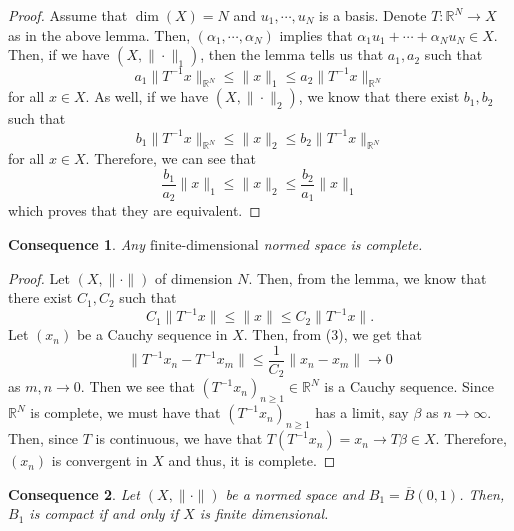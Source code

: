 \documentclass[12pt]{article}
\newtheorem{cons}{Consequence}
\newcommand{\R}{{\mathbb R}}
\newcommand{\fd}{{\text{finite-dimensional}}}
\begin{document}
\vspace{-25pt}
\begin{proof}
Assume that $\dim(X) = N$ and $u_1, \cdots, u_N$ is a basis. Denote $T: \R^N \to X$ as in the above lemma. Then, $(\alpha_1, \cdots, \alpha_N)$ implies that $\alpha_1 u_1 + \cdots + \alpha_N u_N \in X$. Then, if we have $(X, \| \cdot \|_1)$, then the lemma tells us that $a_1, a_2$ such that 
\[a_1 \| T^{-1} x \|_{\R^N} \leq \| x \|_1 \leq a_2 \| T^{-1} x \|_{\R^N}\]
for all $x \in X$. As well, if we have $(X, \| \cdot \|_2)$, we know that there exist $b_1, b_2 $ such that 
\[ b_1 \| T^{-1} x \|_{\R^N} \leq \| x \|_2 \leq b_2 \| T^{-1} x \|_{\R^N}\]
for all $x \in X$. Therefore, we can see that 
\[ \frac{b_1}{a_2} \| x \|_1 \leq \| x \|_2 \leq \frac{b_2}{a_1} \| x \|_1\]
which proves that they are equivalent.
\end{proof}
\begin{cons}
Any $\fd$ normed space is complete. 
\end{cons}
\vspace{-25pt}
\begin{proof}
Let $(X, \| \cdot \| )$ of dimension $N$. Then, from the lemma, we know that there exist $C_1, C_2$ such that
\begin{equation}
C_1 \| T^{-1} x \| \leq \| x \| \leq C_2 \| T^{-1}x \|.
\end{equation}
Let $(x_n)$ be a Cauchy sequence in $X$. Then, from (3), we get that 
\[ \| T^{-1}x_n - T^{-1} x_m \| \leq \frac{1}{C_2} \| x_n - x_m \| \to 0 \]
as $m, n \to 0$. Then we see that $(T^{-1} x_n)_{n \geq 1} \in \R^N$ is a Cauchy sequence. Since $\R^N$ is complete, we must have that $(T^{-1} x_n)_{n \geq 1} $ has a limit, say $\beta$ as $n \to \infty$. Then, since $T$ is continuous, we have that $T(T^{-1} x_n) = x_n \to T\beta \in X$. Therefore, $(x_n)$ is convergent in $X$ and thus, it is complete. 
\end{proof}
\begin{cons}
Let $(X, \| \cdot \|)$ be a normed space and $B_1 = \overline{B}(0, 1)$. Then, $B_1$ is compact if and only if $X$ is finite dimensional. 
\end{cons}
\vspace{-25pt}
\end{document}
